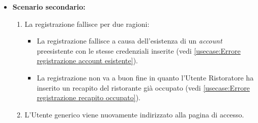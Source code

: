 \begin{itemize}
    \item \textbf{Scenario secondario:}
                \begin{enumerate}
                    \item La registrazione fallisce per due ragioni:
                    \begin{itemize}
                        \item La registrazione fallisce a causa dell'esistenza di un \textit{account} preesistente con le stesse credenziali inserite (vedi \autoref{usecase:Errore registrazione account esistente}).
                        \item La registrazione non va a buon fine in quanto l'Utente Ristoratore ha inserito un recapito del ristorante già occupato (vedi \autoref{usecase:Errore registrazione recapito occupato}).
                    \end{itemize}
                    \item L'Utente generico viene nuovamente indirizzato alla pagina di accesso.
                \end{enumerate}	
          
\end{itemize}